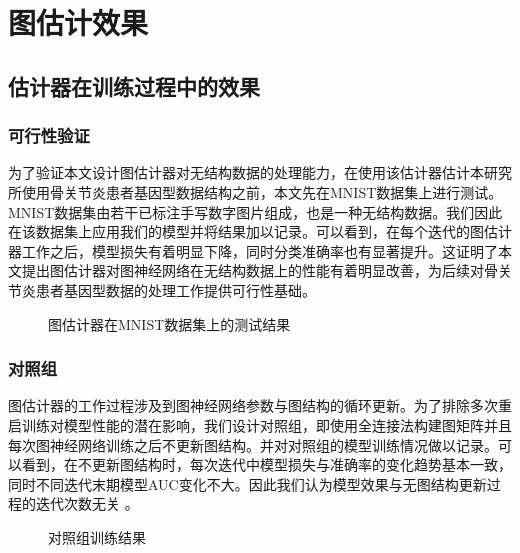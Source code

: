 \section{图估计效果}

\subsection{估计器在训练过程中的效果}

\subsubsection{可行性验证}

为了验证本文设计图估计器对无结构数据的处理能力，在使用该估计器估计本研究所使用骨关节炎患者基因型数据结构之前，本文先在MNIST数据集上进行测试。MNIST数据集\cite{lecun_gradient-based_1998}由若干已标注手写数字图片组成，也是一种无结构数据。我们因此在该数据集上应用我们的模型并将结果加以记录。可以看到，在每个迭代的图估计器工作之后，模型损失有着明显下降，同时分类准确率也有显著提升。这证明了本文提出图估计器对图神经网络在无结构数据上的性能有着明显改善，为后续对骨关节炎患者基因型数据的处理工作提供可行性基础。
\begin{figure}[htbp]
\centering
\subfigure[MNIST数据集上训练损失曲线]{

}
\subfigure[MNIST数据集上训练准确率曲线]{

}
\caption{图估计器在MNIST数据集上的测试结果}
\end{figure}


\subsubsection{对照组}

图估计器的工作过程涉及到图神经网络参数与图结构的循环更新。为了排除多次重启训练对模型性能的潜在影响，我们设计对照组，即使用全连接法构建图矩阵并且每次图神经网络训练之后不更新图结构。并对对照组的模型训练情况做以记录。可以看到，在不更新图结构时，每次迭代中模型损失与准确率的变化趋势基本一致，同时不同迭代末期模型AUC变化不大。因此我们认为模型效果与无图结构更新过程的迭代次数无关
。
\begin{figure}[htbp]
\centering
\subfigure[训练损失曲线]{

}
\subfigure[训练准确率曲线]{

}
\subfigure[测试AUC曲线]{

}
\caption{对照组训练结果}
\end{figure}

